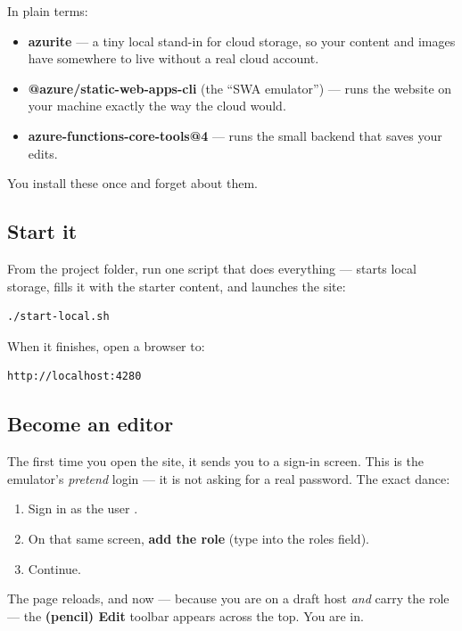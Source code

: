 \documentclass[11pt]{article}
\begin{document}
\noindent In plain terms:
\begin{itemize}[leftmargin=*]
  \item \textbf{azurite} --- a tiny local stand-in for cloud storage, so your content
        and images have somewhere to live without a real cloud account.
  \item \textbf{@azure/static-web-apps-cli} (the ``SWA emulator'') --- runs the
        website on your machine exactly the way the cloud would.
  \item \textbf{azure-functions-core-tools@4} --- runs the small backend that saves
        your edits.
\end{itemize}
You install these once and forget about them.

\subsection{Start it}

From the project folder, run one script that does everything --- starts local
storage, fills it with the starter content, and launches the site:

\begin{lstlisting}
./start-local.sh
\end{lstlisting}

\noindent When it finishes, open a browser to:

\begin{lstlisting}
http://localhost:4280
\end{lstlisting}

\subsection{Become an editor}

The first time you open the site, it sends you to a sign-in screen. This is the
emulator's \emph{pretend} login --- it is not asking for a real password. The exact
dance:

\begin{enumerate}[leftmargin=*]
  \item Sign in as the user .
  \item On that same screen, \textbf{add the role } (type 
        into the roles field).
  \item Continue.
\end{enumerate}

The page reloads, and now --- because you are on a draft host \emph{and} carry the
 role --- the \textbf{(pencil) Edit} toolbar appears across the top. You are in.
\end{document}

